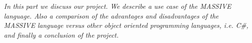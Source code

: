 \textit{In this part we discuss our project. We describe a use case of the MASSIVE language. Also a comparison of the advantages and disadvantages of the MASSIVE language versus other object oriented programming languages, i.e. C\#, and finally a conclusion of the project.}\\ \\